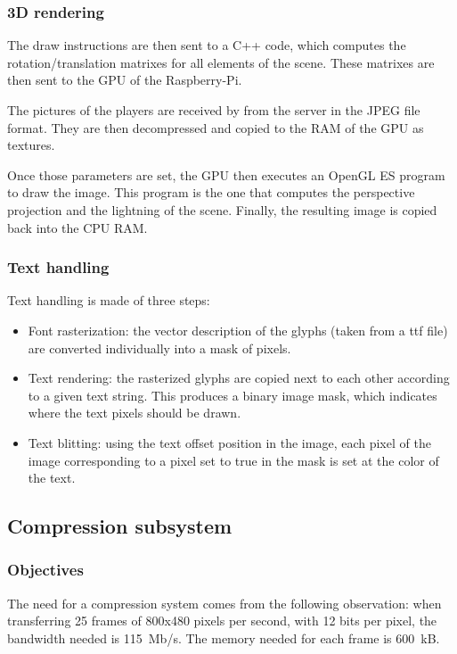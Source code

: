 \documentclass[english, DIV=13]{scrartcl}
\begin{document}
\subsubsection{3D rendering}

The draw instructions are then sent to a C++ code, which computes the rotation/translation
matrixes for all elements of the scene. These matrixes are then sent to the GPU of the
Raspberry-Pi.

The pictures of the players are received by from the server in the JPEG file format.
They are then decompressed and copied to the RAM of the GPU as textures.

Once those parameters are set, the GPU then executes an OpenGL ES program to draw the image.
This program is the one that computes the perspective projection and the lightning of the scene.
Finally, the resulting image is copied back into the CPU RAM.

\subsubsection{Text handling}

Text handling is made of three steps:
\begin{itemize}
    \item Font rasterization: the vector description of the glyphs (taken from a ttf file)
        are converted individually into a mask of pixels.
    \item Text rendering: the rasterized glyphs are copied next to each other according
        to a given text string. This produces a binary image mask, which indicates where
        the text pixels should be drawn.
    \item Text blitting: using the text offset position in the image, each pixel of the image
        corresponding to a pixel set to true in the mask is set at the color of the text.
\end{itemize}


\subsection{Compression subsystem}
\label{sec:compression}

\subsubsection{Objectives}

The need for a compression system comes from the following observation:
when transferring 25 frames of 800x480 pixels per second, with 12 bits per pixel,
the bandwidth needed is \SI{115}{Mb/s}. The memory needed for each frame
is \SI{600}{kB}.
\end{document}
